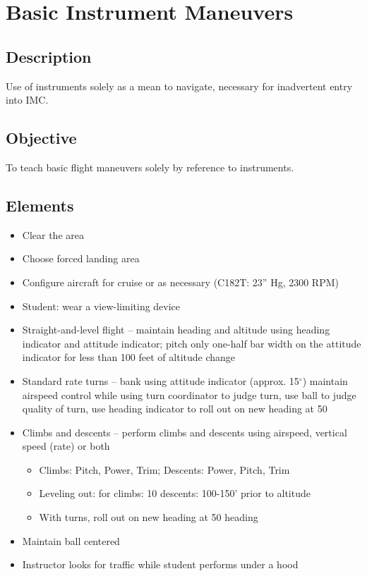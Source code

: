 \section{Basic Instrument Maneuvers}

\subsection{Description}

Use of instruments solely as a mean to navigate,
necessary for inadvertent entry into IMC.

\subsection{Objective}

To teach basic flight maneuvers solely by reference to
instruments.

\subsection{Elements}

\begin{itemize}
  \item Clear the area
  \item Choose forced landing area
  \item Configure aircraft for cruise or as necessary (C182T: 23'' Hg, 2300
    RPM)
  \item Student: wear a view-limiting device
  \item Straight-and-level flight -- maintain heading and altitude using heading
indicator and attitude indicator; pitch only one-half bar width on the attitude
indicator for less than 100 feet of altitude change
  \item Standard rate turns -- bank using attitude indicator (approx.
    15$^\circ$) maintain airspeed control while using turn coordinator to judge
    turn, use ball to judge quality of turn, use heading indicator to roll out
    on new heading at 50%
  \item Climbs and descents -- perform climbs and descents using airspeed,
    vertical speed (rate) or both
    \begin{itemize}
      \item Climbs: Pitch, Power, Trim; Descents: Power, Pitch, Trim
      \item Leveling out: for climbs: 10%
        descents: 100-150' prior to altitude
      \item With turns, roll out on new heading at 50%
        heading
    \end{itemize}
  \item Maintain ball centered
  \item Instructor looks for traffic while student performs under a hood
\end{itemize}

